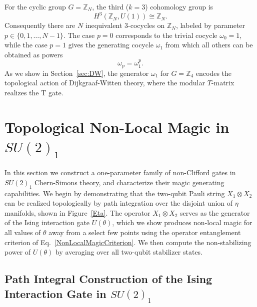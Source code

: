 \documentclass[12pt,a4paper]{article}
\begin{document}
For the cyclic group $G = \mathbb{Z}_N$, the third ($k=3$) cohomology group is
%
\begin{equation}\label{H3ZN}
H^3(\mathbb{Z}_N, U(1)) \cong \mathbb{Z}_N.
\end{equation}
%
Consequently there are $N$ inequivalent $3$-cocycles on $\mathbb{Z}_N$, labeled by parameter $p \in \{0, 1, \ldots, N-1\}$. The case $p = 0$ corresponds to the trivial cocycle $\omega_0 = 1$, while the case $p = 1$ gives the generating cocycle $\omega_1$ from which all others can be obtained as powers
%
\begin{equation}\label{OmegaPowers}
    \omega_p = \omega_1^p.
\end{equation}
%
As we show in Section~\ref{sec:DW}, the generator $\omega_1$ for $G = \mathbb{Z}_4$ encodes the topological action of Dijkgraaf-Witten theory, where the modular $T$-matrix realizes the T gate.




\section{Topological Non-Local Magic in $SU(2)_1$}\label{sec:magic}
 

In this section we construct a one-parameter family of non-Clifford gates in $SU(2)_1$ Chern-Simons theory, and characterize their magic generating capabilities. We begin by demonstrating that the two-qubit Pauli string $X_1 \otimes X_2$ can be realized topologically by path integration over the disjoint union of $\eta$ manifolds, shown in Figure~\ref{Eta}. The operator $X_1 \otimes X_2$ serves as the generator of the Ising interaction gate $U(\theta)$, which we show produces non-local magic for all values of $\theta$ away from a select few  points using the operator entanglement criterion of Eq.\ \eqref{NonLocalMagicCriterion}. We then compute the non-stabilizing power of $U(\theta)$ by averaging over all two-qubit stabilizer states.

\subsection{Path Integral Construction of the Ising Interaction Gate in $SU(2)_1$}\label{subsec:XX_construction}
\end{document}
